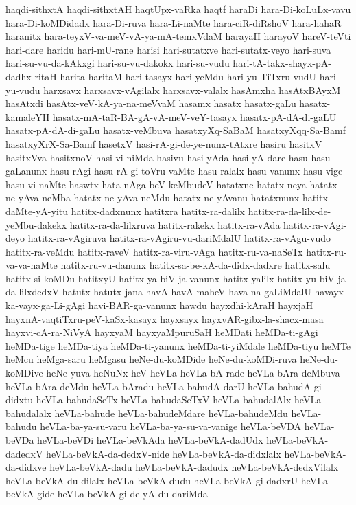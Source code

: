 {haqdi-sithxtA
haqdi-sithxtAH
haqtUpx-vaRka
haqtf
haraDi
hara-Di-koLuLx-vavu
hara-Di-koMDidadx
hara-Di-ruva
hara-Li-naMte
hara-ciR-diRshoV
hara-hahaR
haranitx
hara-teyxV-va-meV-vA-ya-mA-temxVdaM
harayaH
harayoV
hareV-teVti
hari-dare
haridu
hari-mU-rane
harisi
hari-sutatxve
hari-sutatx-veyo
hari-suva
hari-su-vu-da-kAkxgi
hari-su-vu-dakokx
hari-su-vudu
hari-tA-takx-shayx-pA-dadhx-ritaH
harita
haritaM
hari-tasayx
hari-yeMdu
hari-yu-TiTxru-vudU
hari-yu-vudu
harxsavx
harxsavx-vAgilalx
harxsavx-valalx
hasAmxha
hasAtxBAyxM
hasAtxdi
hasAtx-veV-kA-ya-na-meVvaM
hasamx
hasatx
hasatx-gaLu
hasatx-kamaleYH
hasatx-mA-taR-BA-gA-vA-meV-veY-tasayx
hasatx-pA-dA-di-gaLU
hasatx-pA-dA-di-gaLu
hasatx-veMbuva
hasatxyXq-SaBaM
hasatxyXqq-Sa-Bamf
hasatxyXrX-Sa-Bamf
hasetxV
hasi-rA-gi-de-ye-nunx-tAtxre
hasiru
hasitxV
hasitxVva
hasitxnoV
hasi-vi-niMda
hasivu
hasi-yAda
hasi-yA-dare
hasu
hasu-gaLanunx
hasu-rAgi
hasu-rA-gi-toVru-vaMte
hasu-ralalx
hasu-vanunx
hasu-vige
hasu-vi-naMte
haswtx
hata-nAga-beV-keMbudeV
hatatxne
hatatx-neya
hatatx-ne-yAva-neMba
hatatx-ne-yAva-neMdu
hatatx-ne-yAvanu
hatatxnunx
hatitx-daMte-yA-yitu
hatitx-dadxnunx
hatitxra
hatitx-ra-dalilx
hatitx-ra-da-lilx-de-yeMbu-dakekx
hatitx-ra-da-lilxruva
hatitx-rakekx
hatitx-ra-vAda
hatitx-ra-vAgi-deyo
hatitx-ra-vAgiruva
hatitx-ra-vAgiru-vu-dariMdalU
hatitx-ra-vAgu-vudo
hatitx-ra-veMdu
hatitx-raveV
hatitx-ra-viru-vAga
hatitx-ru-va-naSeTx
hatitx-ru-va-va-naMte
hatitx-ru-vu-danunx
hatitx-sa-be-kA-da-didx-dadxre
hatitx-salu
hatitx-si-koMDu
hatitxyU
hatitx-ya-biV-ja-vanunx
hatitx-yalilx
hatitx-yu-biV-ja-da-lilxdedxV
hatutx
hatutx-jana
havA
havA-maheV
hava-na-gaLiMdalU
havayx-ka-vayx-ga-Li-gAgi
havi-BAR-ga-vanunx
hawdu
hayxdhi-kAraH
hayxjaH
hayxnA-vaqtiTxru-peV-kaSx-kasayx
hayxsayx
hayxvAR-gibx-la-shacx-masa
hayxvi-cA-ra-NiVyA
hayxyaM
hayxyaMpuruSaH
heMDati
heMDa-ti-gAgi
heMDa-tige
heMDa-tiya
heMDa-ti-yanunx
heMDa-ti-yiMdale
heMDa-tiyu
heMTe
heMcu
heMga-saru
heMgasu
heNe-du-koMDide
heNe-du-koMDi-ruva
heNe-du-koMDive
heNe-yuva
heNuNx
heV
heVLa
heVLa-bA-rade
heVLa-bAra-deMbuva
heVLa-bAra-deMdu
heVLa-bAradu
heVLa-bahudA-darU
heVLa-bahudA-gi-didxtu
heVLa-bahudaSeTx
heVLa-bahudaSeTxV
heVLa-bahudalAlx
heVLa-bahudalalx
heVLa-bahude
heVLa-bahudeMdare
heVLa-bahudeMdu
heVLa-bahudu
heVLa-ba-ya-su-varu
heVLa-ba-ya-su-va-vanige
heVLa-beVDA
heVLa-beVDa
heVLa-beVDi
heVLa-beVkAda
heVLa-beVkA-dadUdx
heVLa-beVkA-dadedxV
heVLa-beVkA-da-dedxV-nide
heVLa-beVkA-da-didxlalx
heVLa-beVkA-da-didxve
heVLa-beVkA-dadu
heVLa-beVkA-dadudx
heVLa-beVkA-dedxVilalx
heVLa-beVkA-du-dilalx
heVLa-beVkA-dudu
heVLa-beVkA-gi-dadxrU
heVLa-beVkA-gide
heVLa-beVkA-gi-de-yA-du-dariMda
}
